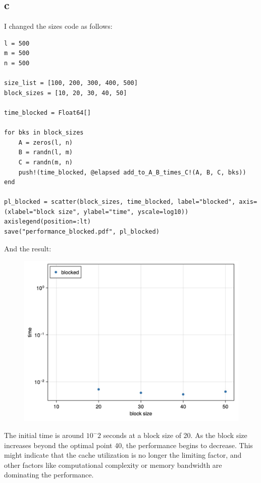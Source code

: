 \documentclass{article}
\begin{document}
\subsection{c}
I changed the sizes code as follows:
\begin{verbatim}
l = 500 
m = 500  
n = 500  

size_list = [100, 200, 300, 400, 500]
block_sizes = [10, 20, 30, 40, 50]

time_blocked = Float64[]

for bks in block_sizes
    A = zeros(l, n)
    B = randn(l, m)
    C = randn(m, n)
    push!(time_blocked, @elapsed add_to_A_B_times_C!(A, B, C, bks))
end

pl_blocked = scatter(block_sizes, time_blocked, label="blocked", axis=(xlabel="block size", ylabel="time", yscale=log10))
axislegend(position=:lt)
save("performance_blocked.pdf", pl_blocked)
\end{verbatim}
And the result:
\begin{figure}[H]
    \centering
    \includegraphics[width=0.8\linewidth]{Photos/Image 2-6-24 at 07.59.jpeg}
\end{figure}
The initial time is around $10^-2$ seconds at a block size of 20. As the block size increases beyond the optimal point 40, the performance begins to decrease. This might indicate that the cache utilization is no longer the limiting factor, and other factors like computational complexity or memory bandwidth are dominating the performance.
\end{document}
